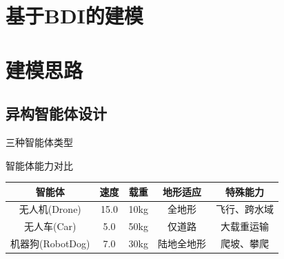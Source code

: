 \documentclass[
10pt,
aspectratio=169,
]{beamer}
\begin{document}
\section{基于BDI的建模}

\section{建模思路}

\subsection{异构智能体设计}

\begin{frame}{三种智能体类型}
    \begin{block}{智能体能力对比}
        \begin{center}
        \begin{tabular}{|c|c|c|c|c|}
        \hline
        \textbf{智能体} & \textbf{速度} & \textbf{载重} & \textbf{地形适应} & \textbf{特殊能力} \\
        \hline
        无人机(Drone) & 15.0 & 10kg & 全地形 & 飞行、跨水域 \\
        \hline
        无人车(Car) & 5.0 & 50kg & 仅道路 & 大载重运输 \\
        \hline
        机器狗(RobotDog) & 7.0 & 30kg & 陆地全地形 & 爬坡、攀爬 \\
        \hline
        \end{tabular}
        \end{center}
    \end{block}
    

\end{frame}
\end{document}

